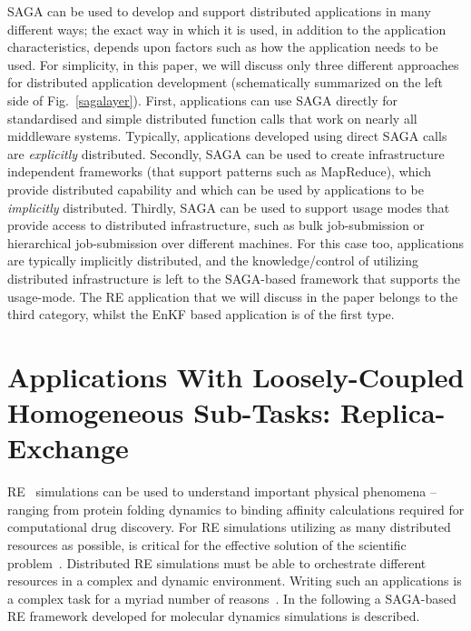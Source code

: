 \documentclass{llncs}
\begin{document}
\upp

SAGA can be used to develop and support distributed applications in
many different ways; the exact way in which it is used, in addition to
the application characteristics, depends upon factors such as how the
application needs to be used. For simplicity, in this paper, we will
discuss only three different approaches for distributed application
development (schematically summarized on the left side of
Fig.~\ref{sagalayer}).  First, applications can use SAGA directly for
standardised and simple distributed function calls that work on nearly
all middleware systems. Typically, applications developed using direct
SAGA calls are {\it explicitly} distributed.  Secondly, SAGA can be
used to create infrastructure independent frameworks (that support
patterns such as MapReduce), which provide distributed capability and
which can be used by applications to be {\it implicitly}
distributed. Thirdly, SAGA can be used to support usage modes that
provide access to distributed infrastructure, such as bulk
job-submission or hierarchical job-submission over different
machines. For this case too, applications are typically implicitly
distributed, and the knowledge/control of utilizing distributed
infrastructure is left to the SAGA-based framework that supports the
usage-mode. The RE application that we will discuss in the paper
belongs to the third category, whilst the EnKF based application is of
the first type.


\section{Applications With Loosely-Coupled Homogeneous
  Sub-Tasks: Replica-Exchange}  

\upp {}
  

RE~\cite{Sugita:1999rm} simulations can be used to understand
important physical phenomena -- ranging from protein folding dynamics
to binding affinity calculations required for computational drug
discovery.  For RE simulations utilizing as many distributed resources
as possible, is critical for the effective solution of the scientific
problem~\cite{repex_ptrsa}.  Distributed RE simulations must be able
to orchestrate different resources in a complex and dynamic
environment.  Writing such an applications is a complex task for a
myriad number of reasons~\cite{repex_escience08}. In the following a
SAGA-based RE framework developed for molecular dynamics simulations
is described.
\end{document}
